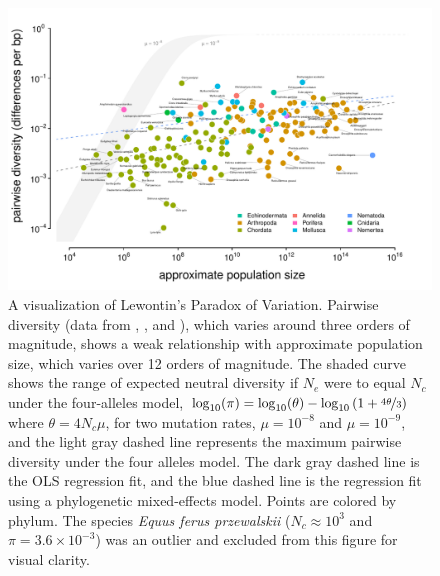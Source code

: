 \documentclass[9pt,lineno]{elife}
\newcommand{\logt}{\log_{10}}
\begin{document}
\begin{figure}
  \begin{fullwidth}
  \includegraphics[width=\linewidth]{figures/diversity_popsize_full.pdf}

  \caption{A visualization of Lewontin's Paradox of Variation. Pairwise
    diversity (data from \cite{Leffler2012-zj}, \cite{Corbett-Detig2015-gt},
    and \cite{Romiguier2014-bp}), which varies around three orders of
    magnitude, shows a weak relationship with approximate population size,
    which varies over 12 orders of magnitude.  The shaded curve shows the range
    of expected neutral diversity if $N_e$ were to equal $N_c$ under the
    four-alleles model, $\log_{10}(\pi) = \logt(\theta) - \logt{(1 +
    \nicefrac{4\theta}{3})}$ where $\theta = 4N_c \mu$, for two mutation rates,
    $\mu = 10^{-8}$ and $\mu = 10^{-9}$, and the light gray dashed line
    represents the maximum pairwise diversity under the four alleles model. The
    dark gray dashed line is the OLS regression fit, and the blue dashed line
    is the regression fit using a phylogenetic mixed-effects model.  Points are
    colored by phylum. The species \emph{Equus ferus przewalskii} ($N_c \approx
    10^3$ and $\pi = 3.6 \times 10^{-3}$) was an outlier and excluded from this
    figure for visual clarity.}\label{fig:pi-Nc}


\end{fullwidth}
\end{figure}
\end{document}
